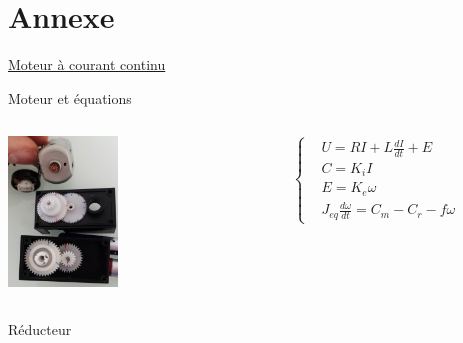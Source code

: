 \documentclass[french, handout]{beamer}
\begin{document}
    \section{Annexe}
        \begin{frame}{\hyperlink{pres_moteur}{Moteur à courant continu}}
        \label{details_moteur}
            \vspace{-0.2cm}
            \begin{block}{Moteur et équations}
                \begin{columns}[c]
                    \begin{column}{3 cm}
                        \includegraphics[width=2.9cm]{motoreducteur.jpg}
                    \end{column}
                    \hspace{-0.3cm}
                    \begin{column}{7 cm}
                        \begin{tcolorbox}[colback=red!5!white, colframe=red!75!black, title=Équations du MCC]
                            {\footnotesize \[ \left\{
                                    \begin{aligned}
                                    &U=RI+L\frac{dI}{dt}+E\\
                                    &C=K_{i}I\\
                                    &E=K_{e}\omega\\
                                    &J_{eq}\frac{d\omega}{dt}=C_{m}-C_{r}-f\omega
                                    \end{aligned}
                                    \right. \]}
                        \end{tcolorbox}
                    \end{column}
                \end{columns}
            \end{block}
            \vspace{-0.1cm}
            \begin{block}{Réducteur}
                \begin{columns}[c]

\end{columns}
\end{block}
\end{frame}
\end{document}
